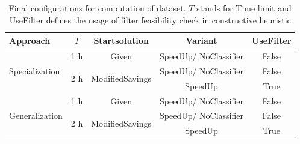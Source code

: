 \begin{table}[ht]
    \centering
    \small
    \begin{tabular}{l c c c c }
        \toprule
        Approach                        & $T$                  & Startsolution                    & Variant               & UseFilter \\
        \midrule
        \multirow{3}{*}{Specialization} & 1 h                  & Given                            & SpeedUp/ NoClassifier & False     \\\cmidrule(lr){2-5}
                                        & \multirow{2}{*}{2 h} & \multirow{2}{*}{ModifiedSavings} & SpeedUp/ NoClassifier & False     \\
                                        &                      &                                  & SpeedUp               & True      \\ \midrule
        \multirow{3}{*}{Generalization} & 1 h                  & Given                            & SpeedUp/ NoClassifier & False     \\\cmidrule(lr){2-5}
                                        & \multirow{2}{*}{2 h} & \multirow{2}{*}{ModifiedSavings} & SpeedUp/ NoClassifier & False     \\
                                        &                      &                                  & SpeedUp               & True      \\
        \bottomrule
    \end{tabular}
    \caption{Final configurations for computation of \krebsADataSetText dataset. $T$ stands for Time limit and UseFilter defines the usage of
        filter feasibility check in constructive heuristic}
\end{table}
